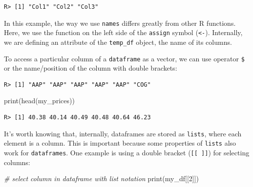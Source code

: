 \documentclass[
  12pt,
]{book}
\newenvironment{Shaded}{\begin{snugshade}}{\end{snugshade}}
\newcommand{\CommentTok}[1]{\textcolor[rgb]{0.37,0.37,0.37}{\textit{#1}}}
\newcommand{\DecValTok}[1]{\textcolor[rgb]{0.06,0.06,0.06}{#1}}
\newcommand{\FunctionTok}[1]{\textcolor[rgb]{0,0,0}{#1}}
\newcommand{\NormalTok}[1]{#1}
\newcommand{\OtherTok}[1]{\textcolor[rgb]{0.37,0.37,0.37}{#1}}
\newcommand{\SpecialCharTok}[1]{\textcolor[rgb]{0,0,0}{#1}}
\begin{document}
\begin{verbatim}
R> [1] "Col1" "Col2" "Col3"
\end{verbatim}

In this example, the way we use \texttt{names} differs greatly from other R functions. Here, we use the function on the left side of the \texttt{assign} symbol (\texttt{\textless{}-}). Internally, we are defining an attribute of the \texttt{temp\_df} object, the name of its columns.

To access a particular column of a \texttt{dataframe} as a vector, we can use operator \texttt{\$} or the name/position of the column with double brackets:

\begin{Shaded}
\end{Shaded}

\begin{verbatim}
R> [1] "AAP" "AAP" "AAP" "AAP" "AAP" "COG"
\end{verbatim}

\begin{Shaded}
\begin{Highlighting}[]
\FunctionTok{print}\NormalTok{(}\FunctionTok{head}\NormalTok{(my\_prices))}
\end{Highlighting}
\end{Shaded}

\begin{verbatim}
R> [1] 40.38 40.14 40.49 40.48 40.64 46.23
\end{verbatim}

It's worth knowing that, internally, dataframes are stored as \texttt{lists}, where each element is a column. This is important because some properties of \texttt{lists} also work for \texttt{dataframes}. One example is using a double bracket (\texttt{{[}{[}\ {]}{]}}) for selecting columns:

\begin{Shaded}
\begin{Highlighting}[]
\CommentTok{\# select column in dataframe with list notation}
\FunctionTok{print}\NormalTok{(my\_df[[}\DecValTok{2}\NormalTok{]])}
\end{Highlighting}
\end{Shaded}
\end{document}
